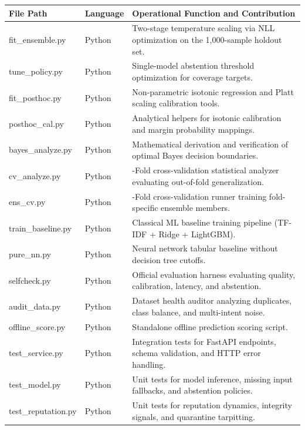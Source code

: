 \documentclass[11pt,a4paper]{article}
\begin{document}
\begin{table}[htbp]
\centering
\small
\renewcommand{\arraystretch}{1.2}
\begin{tabularx}{\linewidth}{>{\raggedright\arraybackslash\ttfamily\small}p{5.1cm} >{\raggedright\arraybackslash}p{1.8cm} >{\raggedright\arraybackslash}X}
\toprule
\textbf{File Path} & \textbf{Language} & \textbf{Operational Function and Contribution} \\
\midrule
fit\_ensemble.py & Python & Two-stage temperature scaling via NLL optimization on the 1,000-sample holdout set. \\
tune\_policy.py & Python & Single-model abstention threshold optimization for coverage targets. \\
fit\_posthoc.py & Python & Non-parametric isotonic regression and Platt scaling calibration tools. \\
posthoc\_cal.py & Python & Analytical helpers for isotonic calibration and margin probability mappings. \\
bayes\_analyze.py & Python & Mathematical derivation and verification of optimal Bayes decision boundaries. \\
cv\_analyze.py & Python & 4-Fold cross-validation statistical analyzer evaluating out-of-fold generalization. \\
ens\_cv.py & Python & 4-Fold cross-validation runner training fold-specific ensemble members. \\
train\_baseline.py & Python & Classical ML baseline training pipeline (TF-IDF + Ridge + LightGBM). \\
pure\_nn.py & Python & Neural network tabular baseline without decision tree cutoffs. \\
selfcheck.py & Python & Official evaluation harness evaluating quality, calibration, latency, and abstention. \\
audit\_data.py & Python & Dataset health auditor analyzing duplicates, class balance, and multi-intent noise. \\
offline\_score.py & Python & Standalone offline prediction scoring script. \\
test\_service.py & Python & Integration tests for FastAPI endpoints, schema validation, and HTTP error handling. \\
test\_model.py & Python & Unit tests for model inference, missing input fallbacks, and abstention policies. \\
test\_reputation.py & Python & Unit tests for reputation dynamics, integrity signals, and quarantine tarpitting. \\

\end{tabularx}
\end{table}
\end{document}
